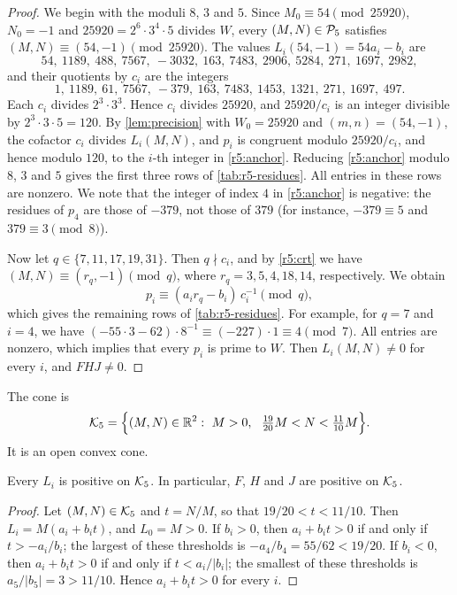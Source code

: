 \begin{proof}
We begin with the moduli $8$, $3$ and $5$. Since $M_0\equiv54\pmod{25920}$, $N_0=-1$ and $25920=2^6\cdot3^4\cdot5$ divides $W$, every $(M,N)\in\mathcal P_5$ satisfies $(M,N)\equiv(54,-1)\pmod{25920}$. The values $L_i(54,-1)=54a_i-b_i$ are
\[
54,\ 1189,\ 488,\ 7567,\ -3032,\ 163,\ 7483,\ 2906,\ 5284,\ 271,\ 1697,\ 2982,
\]
and their quotients by $c_i$ are the integers
\begin{equation}\label{r5:anchor}
1,\ 1189,\ 61,\ 7567,\ -379,\ 163,\ 7483,\ 1453,\ 1321,\ 271,\ 1697,\ 497.
\end{equation}
Each $c_i$ divides $2^3\cdot3^3$. Hence $c_i$ divides $25920$, and $25920/c_i$ is an integer divisible by $2^3\cdot3\cdot5=120$. By \cref{lem:precision} with $W_0=25920$ and $(m,n)=(54,-1)$, the cofactor $c_i$ divides $L_i(M,N)$, and $p_i$ is congruent modulo $25920/c_i$, and hence modulo $120$, to the $i$-th integer in \eqref{r5:anchor}. Reducing \eqref{r5:anchor} modulo $8$, $3$ and $5$ gives the first three rows of \cref{tab:r5-residues}. All entries in these rows are nonzero. We note that the integer of index $4$ in \eqref{r5:anchor} is negative: the residues of $p_4$ are those of $-379$, not those of $379$ (for instance, $-379\equiv5$ and $379\equiv3\pmod8$).

Now let $q\in\{7,11,17,19,31\}$. Then $q\nmid c_i$, and by \eqref{r5:crt} we have $(M,N)\equiv(r_q,-1)\pmod q$, where $r_q=3,5,4,18,14$, respectively. We obtain
\[
p_i\equiv(a_ir_q-b_i)\,c_i^{-1}\pmod q,
\]
which gives the remaining rows of \cref{tab:r5-residues}. For example, for $q=7$ and $i=4$, we have $(-55\cdot3-62)\cdot8^{-1}\equiv(-227)\cdot1\equiv4\pmod7$. All entries are nonzero, which implies that every $p_i$ is prime to $W$. Then $L_i(M,N)\ne0$ for every $i$, and $FHJ\ne0$.
\end{proof}

The cone is
\begin{equation}\label{r5:cone}
\cK_5=\Big\{(M,N)\in\R^2:\ M>0,\ \ \tfrac{19}{20}M<N<\tfrac{11}{10}M\Big\}.
\end{equation}
It is an open convex cone.

\begin{lemma}\label{lem:r5-cone}
Every $L_i$ is positive on $\mathcal K_5$. In particular, $F$, $H$ and $J$ are positive on $\mathcal K_5$.
\end{lemma}

\begin{proof}
Let $(M,N)\in\mathcal K_5$ and $t=N/M$, so that $19/20<t<11/10$. Then $L_i=M(a_i+b_it)$, and $L_0=M>0$. If $b_i>0$, then $a_i+b_it>0$ if and only if $t>-a_i/b_i$; the largest of these thresholds is $-a_4/b_4=55/62<19/20$. If $b_i<0$, then $a_i+b_it>0$ if and only if $t<a_i/|b_i|$; the smallest of these thresholds is $a_5/|b_5|=3>11/10$. Hence $a_i+b_it>0$ for every $i$.
\end{proof}

